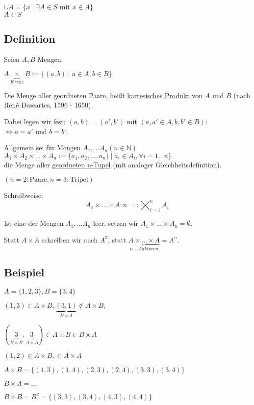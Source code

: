 \documentclass[a4paper, 12pt, twoside] {article}
\begin{document}
$\cup A = \{ x \mid \exists A \in S$ mit $x \in A\} $ \\
$ A \in S$

\subsection[Definition (kartesisches Produkt)]{Definition} %
Seien $A, B$ Mengen.

$A \underbrace{\times}_{Kreuz} B := \{(a, b) \mid a \in A, b \in B\}$

Die Menge aller geordneten Paare, heißt \underline{kartesisches Produkt} von $A$ und $B$ (nach René Descartes, 1596 - 1650).

Dabei legen wir fest: $(a, b) = (a', b')$ mit $(a, a' \in A, b, b' \in B):$ \\
$\Leftrightarrow a = a' \text{ und } b = b‘$.

Allgemein sei für Mengen $A_1, ... A_n (n \in \mathbb{N})$ \\
$A_1 \times A_2 \times ... \times A_n := \{a_1, a_2, ..., a_n) \mid a_i \in A_i, \forall i = 1 ... n\}$ \\
die Menge aller \underline{geordneten n-Tupel} (mit analoger Gleichheitsdefinition).

$(n = 2: \text{Paare}, n = 3: \text{Tripel})$

Schreibweise: \\
$$A_1 \times ... \times A:n =: \bigtimes_{i=1}^{n} A_i$$

Ist eine der Mengen $A_1, ... A_n$ leer, setzen wir $A_1 \times ... \times A_n = \emptyset$.

Statt $A \times A$ schreiben wir auch $A^2$, statt $\underbrace{A \times ... \times A}_{n-Faktoren} = A^n$.


\subsection{Beispiel} %
$A = \{1, 2, 3\}, B = \{3, 4\}$

$(1, 3) \in A \times B, \underbrace{(3, 1)}_{B \times A} \notin A \times B,$

$(\underbrace{3}_{B \times B}, \underbrace{3}_{A \times A}) \in A \times B\in B \times A$

$(1, 2) \in A \times B, \in A \times A$

$A \times B = \{(1, 3), (1, 4), (2, 3), (2, 4), (3, 3), (3, 4)\}$

$B \times A = ...$

$B \times B = B^2 = \{(3, 3), (3, 4), (4, 3), (4, 4)\}$
\end{document}
